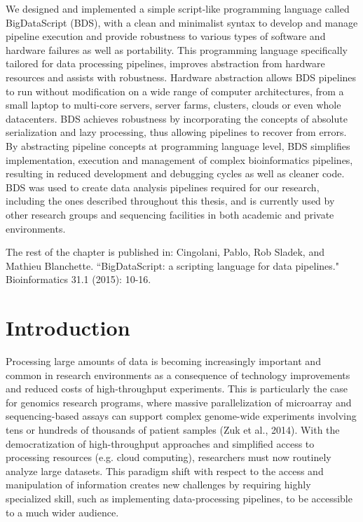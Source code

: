 We designed and implemented a simple script-like programming language called BigDataScript (BDS), with a clean and minimalist syntax to develop and manage pipeline execution and provide robustness to various types of software and hardware failures as well as portability.  This programming language specifically tailored for data processing pipelines, improves abstraction from hardware resources and assists with robustness. Hardware abstraction allows BDS pipelines to run without modification on a wide range of computer architectures, from a small laptop to multi-core servers, server farms, clusters, clouds or even whole datacenters. BDS achieves robustness by incorporating the concepts of absolute serialization and lazy processing, thus allowing pipelines to recover from errors. By abstracting pipeline concepts at programming language level, BDS simplifies implementation, execution and management of complex bioinformatics pipelines, resulting in reduced development and debugging cycles as well as cleaner code. BDS was used to create data analysis pipelines required for our research, including the ones described throughout this thesis, and is currently used by other research groups and  sequencing facilities in both academic and private environments.

The rest of the chapter is published in: Cingolani, Pablo, Rob Sladek, and Mathieu Blanchette. ``BigDataScript: a scripting language for data pipelines." Bioinformatics 31.1 (2015): 10-16.


\section{Introduction}

Processing large amounts of data is becoming increasingly important and common in research environments as a consequence of technology improvements and reduced costs of high-throughput experiments. This is particularly the case for genomics research programs, where massive parallelization of microarray and sequencing-based assays can support complex genome-wide experiments involving tens or hundreds of thousands of patient samples (Zuk et al., 2014). With the democratization of high-throughput approaches and simplified access to processing resources (e.g. cloud computing), researchers must now routinely analyze large datasets. This paradigm shift with respect to the access and manipulation of information creates new challenges by requiring highly specialized skill, such as implementing data-processing pipelines, to be accessible to a much wider audience.

